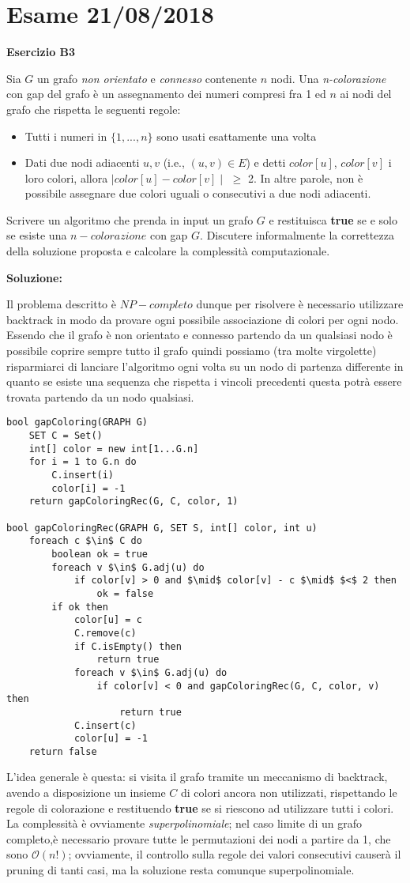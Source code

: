 \documentclass[../cheatSheetAlgoritmi.tex]{subfiles}
\begin{document}
\section{Esame 21/08/2018}
\textbf{Esercizio B3}

Sia $G$ un grafo \emph{non orientato} e \emph{connesso} contenente $n$ nodi. Una \emph{n-colorazione} con gap del grafo è un assegnamento dei numeri compresi fra 1 ed $n$ ai nodi del grafo che rispetta le seguenti regole:
\begin{itemize}
	\item Tutti i numeri in $\{1,...,n\}$ sono usati esattamente una volta
	\item Dati due nodi adiacenti $u, v$ (i.e., $(u, v) \in E$) e detti $color[u]$, $color[v]$ i  loro  colori,  allora $\mid color[u] - color[v] \mid$ $\geq$ 2. In altre parole, non è possibile assegnare due colori uguali o consecutivi a due nodi adiacenti.
\end{itemize}
Scrivere un algoritmo che prenda in input un grafo $G$ e restituisca \textbf{true} se e solo se esiste una $n-colorazione$ con gap $G$. Discutere informalmente la correttezza   della soluzione proposta e calcolare la complessità computazionale.

\textbf{Soluzione:}

Il problema descritto è $NP-completo$ dunque per risolvere è necessario utilizzare backtrack in modo da provare ogni possibile associazione di colori per ogni nodo. Essendo che il grafo è non orientato e connesso partendo da un qualsiasi nodo è possibile coprire sempre tutto il grafo quindi possiamo (tra molte virgolette) risparmiarci di lanciare l'algoritmo ogni volta su un nodo di partenza differente in quanto se esiste una sequenza che rispetta i vincoli precedenti questa potrà essere trovata partendo da un nodo qualsiasi.
\begin{lstlisting}[caption=n-Colorazione (gapColoring)]
bool gapColoring(GRAPH G)
	SET C = Set()
	int[] color = new int[1...G.n]
	for i = 1 to G.n do
		C.insert(i)
		color[i] = -1
	return gapColoringRec(G, C, color, 1)
	
bool gapColoringRec(GRAPH G, SET S, int[] color, int u)
	foreach c $\in$ C do
		boolean ok = true
		foreach v $\in$ G.adj(u) do
			if color[v] > 0 and $\mid$ color[v] - c $\mid$ $<$ 2 then
				ok = false
		if ok then
			color[u] = c
			C.remove(c)
			if C.isEmpty() then
				return true
			foreach v $\in$ G.adj(u) do
				if color[v] < 0 and gapColoringRec(G, C, color, v) then
					return true
			C.insert(c)
			color[u] = -1
	return false
\end{lstlisting}
L'idea generale è questa: si visita il grafo tramite un meccanismo di backtrack, avendo a disposizione un insieme $C$ di colori ancora non utilizzati, rispettando le regole di colorazione e restituendo \textbf{true} se si riescono ad utilizzare tutti i colori. La complessità è ovviamente \emph{superpolinomiale}; nel caso limite di un grafo completo,è necessario provare tutte le permutazioni dei nodi a partire da 1, che sono $\mathcal{O}(n!)$; ovviamente, il controllo sulla regole dei valori consecutivi causerà il pruning di tanti casi, ma la soluzione resta comunque superpolinomiale.
\newpage
\end{document}
